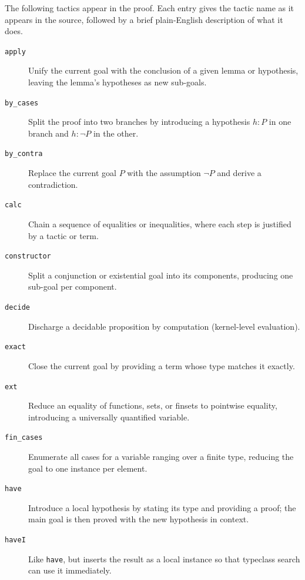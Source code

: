 \documentclass{amsart}
\begin{document}
The following tactics appear in the proof.  Each entry gives the tactic
name as it appears in the source, followed by a brief plain-English
description of what it does.

\begin{description}
  \item[\texttt{apply}]
    Unify the current goal with the conclusion of a given lemma or
    hypothesis, leaving the lemma's hypotheses as new sub-goals.

  \item[\texttt{by\_cases}]
    Split the proof into two branches by introducing a hypothesis \(h : P\)
    in one branch and \(h : \neg P\) in the other.

  \item[\texttt{by\_contra}]
    Replace the current goal \(P\) with the assumption \(\neg P\) and
    derive a contradiction.

  \item[\texttt{calc}]
    Chain a sequence of equalities or inequalities, where each step is
    justified by a tactic or term.

  \item[\texttt{constructor}]
    Split a conjunction or existential goal into its components, producing
    one sub-goal per component.

  \item[\texttt{decide}]
    Discharge a decidable proposition by computation (kernel-level
    evaluation).

  \item[\texttt{exact}]
    Close the current goal by providing a term whose type matches it
    exactly.

  \item[\texttt{ext}]
    Reduce an equality of functions, sets, or finsets to pointwise
    equality, introducing a universally quantified variable.

  \item[\texttt{fin\_cases}]
    Enumerate all cases for a variable ranging over a finite type, reducing
    the goal to one instance per element.

  \item[\texttt{have}]
    Introduce a local hypothesis by stating its type and providing a proof;
    the main goal is then proved with the new hypothesis in context.

  \item[\texttt{haveI}]
    Like \texttt{have}, but inserts the result as a local instance so that
    typeclass search can use it immediately.


\end{description}
\end{document}
